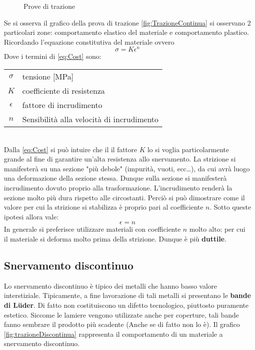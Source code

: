 \begin{figure}
\centering
{} \quad
{}
\caption{Prove di trazione}\label{fig:Trazione}
\end{figure}
Se si osserva il grafico della prova di trazione \ref{fig:TrazioneContinua}
si osservano 2 particolari zone: comportamento elastico del materiale e comportamento plastico.
Ricordando l'equazione constitutiva del materiale ovvero
\begin{equation}
\sigma = K \epsilon ^n
\label{eq:Cost}
\end{equation}
Dove i termini di \ref{eq:Cost} sono:\\
\begin{tabular}{cl}
$\sigma$ & tensione [MPa]\\
$K$ & coefficiente di resistenza\\
$\epsilon$ & fattore di incrudimento\\
$n$ & Sensibilità alla velocità di incrudimento\\
\end{tabular}
\\
Dalla \ref{eq:Cost} si può intuire che il il fattore $K$ lo si voglia particolarmente grande al fine di garantire un'alta resistenza allo snervamento.
La strizione si manifesterà su una sezione "più debole" (impurità, vuoti, ecc\dots), da cui avrà luogo una deformazione della sezione stessa. Dunque sulla sezione si manifesterà incrudimento dovuto proprio alla trasformazione.
L'incrudimento renderà la sezione molto più dura rispetto alle circostanti. Perciò si può dimostrare come il valore per cui la strizione si stabilizza è proprio pari al coefficiente $n$.
Sotto queste ipotesi allora vale:
\begin{equation}
\epsilon = n
\label{eq:StrizzCost}
\end{equation}
In generale si preferisce utilizzare materiali con coefficiente $n$ molto alto: per cui il materiale 
si deforma molto prima della strizione. Dunque è più \textbf{duttile}.

\subsection{Snervamento discontinuo}
Lo snervamento discontinuo è tipico dei metalli che hanno basso valore interstiziale.
Tipicamente, a fine lavorazione di tali metalli si presentano le \textbf{bande di Lüder}. Di fatto non costituiscono un difetto tecnologico, piuttosto puramente estetico. Siccome le lamiere vengono utilizzate anche per coperture, tali bande fanno sembrare il prodotto più scadente (Anche se di fatto non lo è).
Il grafico \ref{fig:trazioneDiscontinua} rappresenta il comportamento di un materiale a snervamento discontinuo.

